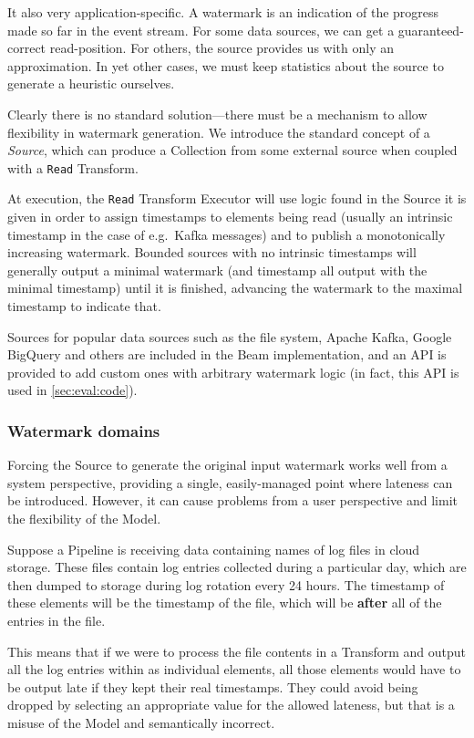 It also very application-specific.
A watermark is an indication of the progress made so far in the event stream.
For some data sources, we can get a guaranteed-correct read-position.
For others, the source provides us with only an approximation.
In yet other cases, we must keep statistics about the source to generate a heuristic ourselves.

Clearly there is no standard solution---there must be a mechanism to allow flexibility in watermark generation.
We introduce the standard concept of a \emph{Source}, which can produce a Collection from some external source when coupled with a \verb|Read| Transform.

At execution, the \verb|Read| Transform Executor will use logic found in the Source it is given in order to assign timestamps to elements being read (usually an intrinsic timestamp in the case of e.g.\ Kafka messages) and to publish a monotonically increasing watermark.
Bounded sources with no intrinsic timestamps will generally output a minimal watermark (and timestamp all output with the minimal timestamp) until it is finished, advancing the watermark to the maximal timestamp to indicate that.

Sources for popular data sources such as the file system, Apache Kafka, Google BigQuery and others are included in the Beam implementation, and an API is provided to add custom ones with arbitrary watermark logic (in fact, this API is used in \cref{sec:eval:code}).

\subsubsection{Watermark domains}

Forcing the Source to generate the original input watermark works well from a system perspective, providing a single, easily-managed point where lateness can be introduced.
However, it can cause problems from a user perspective and limit the flexibility of the Model.

Suppose a Pipeline is receiving data containing names of log files in cloud storage.
These files contain log entries collected during a particular day, which are then dumped to storage during log rotation every 24 hours.
The timestamp of these elements will be the timestamp of the file, which will be \textbf{after} all of the entries in the file.

This means that if we were to process the file contents in a Transform and output all the log entries within as individual elements, all those elements would have to be output late if they kept their real timestamps.
They could avoid being dropped by selecting an appropriate value for the allowed lateness, but that is a misuse of the Model and semantically incorrect.

